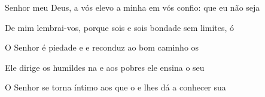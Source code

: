 \begin{multicols}{2}
    \begin{greenumerate}
      \item {}Senhor meu Deus, a vós elevo a minha  em vós confio: que eu não seja 

      \item {}De mim lembrai-vos, porque sois  e sois bondade sem limites, ó 

      \item {}O Senhor é piedade e  e reconduz ao bom caminho os 

      \item {}Ele dirige os humildes na  e aos pobres ele ensina o seu 

      \item {}O Senhor se torna íntimo aos que o  e lhes dá a conhecer sua 
    \end{greenumerate}
  \end{multicols}
